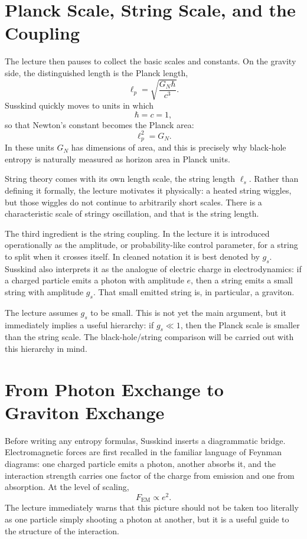 \section{Planck Scale, String Scale, and the Coupling}

The lecture then pauses to collect the basic scales and constants. On the gravity side, the distinguished length is the Planck length,
\begin{equation}
\ell_p=\sqrt{\frac{G_N\hbar}{c^3}}.
\end{equation}
Susskind quickly moves to units in which
\begin{equation}
\hbar=c=1,
\end{equation}
so that Newton's constant becomes the Planck area:
\begin{equation}
\ell_p^2=G_N.
\end{equation}
In these units \(G_N\) has dimensions of area, and this is precisely why black-hole entropy is naturally measured as horizon area in Planck units.

String theory comes with its own length scale, the string length \(\ell_s\). Rather than defining it formally, the lecture motivates it physically: a heated string wiggles, but those wiggles do not continue to arbitrarily short scales. There is a characteristic scale of stringy oscillation, and that is the string length.

The third ingredient is the string coupling. In the lecture it is introduced operationally as the amplitude, or probability-like control parameter, for a string to split when it crosses itself. In cleaned notation it is best denoted by \(g_s\). Susskind also interprets it as the analogue of electric charge in electrodynamics: if a charged particle emits a photon with amplitude \(e\), then a string emits a small string with amplitude \(g_s\). That small emitted string is, in particular, a graviton.

The lecture assumes \(g_s\) to be small. This is not yet the main argument, but it immediately implies a useful hierarchy: if \(g_s\ll 1\), then the Planck scale is smaller than the string scale. The black-hole/string comparison will be carried out with this hierarchy in mind.

\section{From Photon Exchange to Graviton Exchange}

Before writing any entropy formulas, Susskind inserts a diagrammatic bridge. Electromagnetic forces are first recalled in the familiar language of Feynman diagrams: one charged particle emits a photon, another absorbs it, and the interaction strength carries one factor of the charge from emission and one from absorption. At the level of scaling,
\begin{equation}
F_{\mathrm{EM}}\propto e^2.
\end{equation}
The lecture immediately warns that this picture should not be taken too literally as one particle simply shooting a photon at another, but it is a useful guide to the structure of the interaction.

